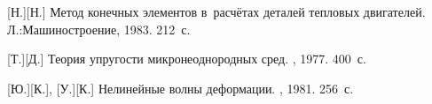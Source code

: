 \begin{thebibliography}{123}
\begin{otherlanguage}{russian}
[Н.][Н.] Метод конечных элементов в~расчётах деталей тепловых двигателей. Л.:\;Машино\-строение, 1983. 212~с.

[Т.][Д.] Теория упругости микронеоднородных сред. \naukapublisher, 1977. 400~с.

[Ю.][К.], [У.][К.] Нелинейные волны деформации. \naukapublisher, 1981. 256~с.

\end{otherlanguage}

\normalsize
\end{thebibliography}
